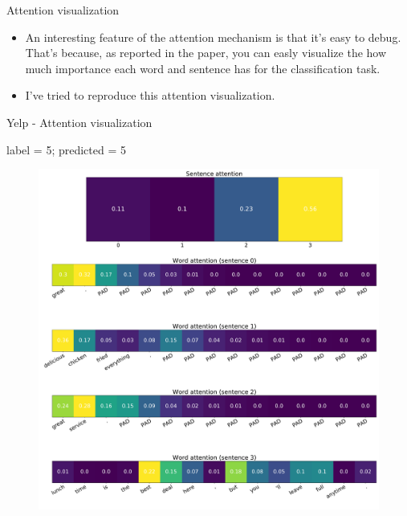 \documentclass[10pt]{beamer}
\begin{document}


\begin{frame}{Attention visualization}

\begin{itemize}
\item
An interesting feature of the attention mechanism is that it's easy to debug. That's because, as reported in the paper, you can easly visualize the how much importance each word and sentence has for the classification task.
\item
I've tried to reproduce this attention visualization.
\end{itemize}

\end{frame}


\begin{frame}{Yelp - Attention visualization}

label = 5; predicted = 5

\begin{figure}
\centering
\includegraphics[scale=0.15]{img/yelp-han-visual}
\end{figure}

\end{frame}
\end{document}
